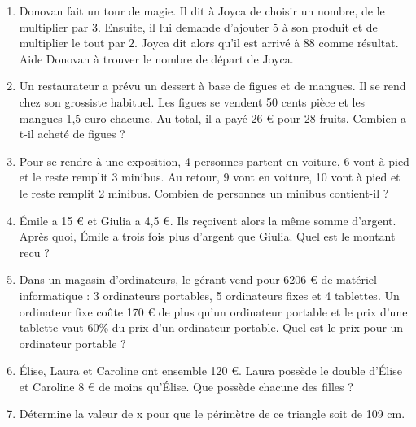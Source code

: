 \begin{enumerate}
        \item Donovan fait un tour de magie. Il dit à Joyca de choisir un nombre, de
              le multiplier par $3$. Ensuite, il lui demande d'ajouter $5$ à son
              produit et de multiplier le tout par $2$. Joyca dit alors qu'il
              est arrivé à $88$ comme résultat. Aide Donovan à trouver le nombre de
              départ de Joyca.
        \item Un  restaurateur a prévu un dessert à base de figues et de mangues. Il se rend chez son grossiste habituel. Les figues se vendent 50 cents pièce et les mangues 1,5 euro chacune. Au total, il a payé 26 € pour 28 fruits. Combien a-t-il acheté de figues ?
        \item Pour  se rendre à une exposition, 4 personnes partent en voiture, 6 vont à pied et le reste remplit 3 minibus.
        Au retour, 9 vont en voiture, 10 vont à pied et le reste remplit 2 minibus.
        Combien de personnes un minibus contient-il ?
        \item Émile  a 15 € et Giulia a 4,5 €. Ils reçoivent alors la même somme d'argent. Après quoi, Émile a trois fois plus d'argent que Giulia. Quel est le montant recu ?
        \item Dans un magasin d'ordinateurs, le gérant vend pour 6206 € de matériel informatique : 3 ordinateurs portables, 5 ordinateurs fixes et 4 tablettes. Un ordinateur fixe coûte 170 € de plus qu'un ordinateur portable et le prix d'une tablette vaut 60\% du prix d'un ordinateur portable. Quel est le prix pour un ordinateur portable ?
        \item Élise, Laura et Caroline ont ensemble 120 €. Laura possède le double d'Élise et Caroline 8  € de moins qu'Élise. Que possède chacune des filles ?
        \item Détermine la valeur de x pour que le périmètre de ce triangle soit de 109 cm.
      \end{enumerate}
